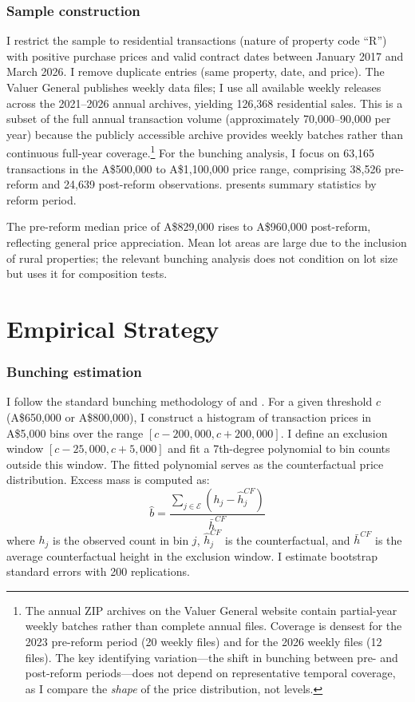 \documentclass[12pt]{article}
\begin{document}
\subsubsection*{Sample construction} I restrict the sample to residential transactions (nature of property code ``R'') with positive purchase prices and valid contract dates between January 2017 and March 2026. I remove duplicate entries (same property, date, and price). The Valuer General publishes weekly data files; I use all available weekly releases across the 2021--2026 annual archives, yielding 126,368 residential sales. This is a subset of the full annual transaction volume (approximately 70,000--90,000 per year) because the publicly accessible archive provides weekly batches rather than continuous full-year coverage.\footnote{The annual ZIP archives on the Valuer General website contain partial-year weekly batches rather than complete annual files. Coverage is densest for the 2023 pre-reform period (20 weekly files) and for the 2026 weekly files (12 files). The key identifying variation---the shift in bunching between pre- and post-reform periods---does not depend on representative temporal coverage, as I compare the \textit{shape} of the price distribution, not levels.} For the bunching analysis, I focus on 63,165 transactions in the A\$500,000 to A\$1,100,000 price range, comprising 38,526 pre-reform and 24,639 post-reform observations.  presents summary statistics by reform period.



The pre-reform median price of A\$829,000 rises to A\$960,000 post-reform, reflecting general price appreciation. Mean lot areas are large due to the inclusion of rural properties; the relevant bunching analysis does not condition on lot size but uses it for composition tests.

\section{Empirical Strategy}
\label{sec:strategy}

\subsubsection*{Bunching estimation} I follow the standard bunching methodology of \citet{chetty2011} and \citet{kleven2016}. For a given threshold $c$ (A\$650,000 or A\$800,000), I construct a histogram of transaction prices in A\$5,000 bins over the range $[c - 200{,}000, c + 200{,}000]$. I define an exclusion window $[c - 25{,}000, c + 5{,}000]$ and fit a 7th-degree polynomial to bin counts outside this window. The fitted polynomial serves as the counterfactual price distribution. Excess mass is computed as:
\begin{equation}
  \hat{b} = \frac{\sum_{j \in \mathcal{E}} (h_j - \hat{h}_j^{CF})}{\bar{h}^{CF}}
  \label{eq:bunching}
\end{equation}
where $h_j$ is the observed count in bin $j$, $\hat{h}_j^{CF}$ is the counterfactual, and $\bar{h}^{CF}$ is the average counterfactual height in the exclusion window. I estimate bootstrap standard errors with 200 replications.
\end{document}
